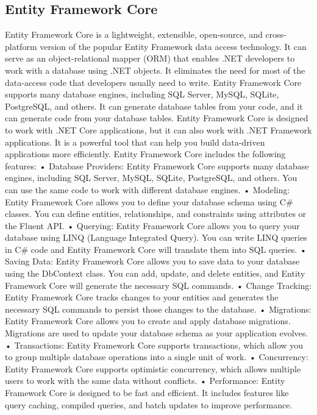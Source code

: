 \subsection{Entity Framework Core}
Entity Framework Core is a lightweight, extensible, open-source, and cross-platform version of the popular Entity Framework data access technology. 
It can serve as an object-relational mapper (ORM) that enables .NET developers to work with a database using .NET objects. 
It eliminates the need for most of the data-access code that developers usually need to write. Entity Framework Core supports many database engines, including SQL Server, MySQL, SQLite, PostgreSQL, and others. 
It can generate database tables from your code, and it can generate code from your database tables. 
Entity Framework Core is designed to work with .NET Core applications, but it can also work with .NET Framework applications. 
It is a powerful tool that can help you build data-driven applications more efficiently. Entity Framework Core includes the following features:
•	Database Providers: Entity Framework Core supports many database engines, including SQL Server, MySQL, SQLite, PostgreSQL, and others. You can use the same code to work with different database engines.
•	Modeling: Entity Framework Core allows you to define your database schema using C\# classes. You can define entities, relationships, and constraints using attributes or the Fluent API.
•	Querying: Entity Framework Core allows you to query your database using LINQ (Language Integrated Query). You can write LINQ queries in C\# code and Entity Framework Core will translate them into SQL queries.
•	Saving Data: Entity Framework Core allows you to save data to your database using the DbContext class. You can add, update, and delete entities, and Entity Framework Core will generate the necessary SQL commands.
•	Change Tracking: Entity Framework Core tracks changes to your entities and generates the necessary SQL commands to persist those changes to the database.
•	Migrations: Entity Framework Core allows you to create and apply database migrations. Migrations are used to update your database schema as your application evolves.
•	Transactions: Entity Framework Core supports transactions, which allow you to group multiple database operations into a single unit of work.
•	Concurrency: Entity Framework Core supports optimistic concurrency, which allows multiple users to work with the same data without conflicts.
•	Performance: Entity Framework Core is designed to be fast and efficient. It includes features like query caching, compiled queries, and batch updates to improve performance.

